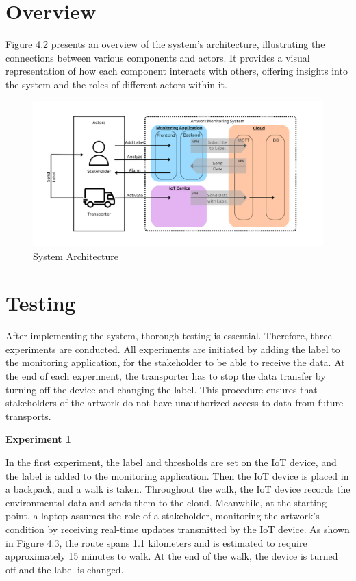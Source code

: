 \section{Overview}
Figure 4.2 presents an overview of the system's architecture, illustrating the connections between various components and actors. It provides a visual representation of how each component interacts with others, offering insights into the system and the roles of different actors within it.

\begin{figure}[H]
    \centering
    \includegraphics[width=1\linewidth]{System_Architecture.png}
    \caption{System Architecture}
    \label{fig:System Architecture}
\end{figure}

\section{Testing}
After implementing the system, thorough testing is essential. Therefore, three experiments are conducted. All experiments are initiated by adding the label to the monitoring application, for the stakeholder to be able to receive the data. At the end of each experiment, the transporter has to stop the data transfer by turning off the device and changing the label. This procedure ensures that stakeholders of the artwork do not have unauthorized access to data from future transports.

\textbf{Experiment 1}

In the first experiment, the label and thresholds are set on the IoT device, and the label is added to the monitoring application. Then the IoT device is placed in a backpack, and a walk is taken. Throughout the walk, the IoT device records the environmental data and sends them to the cloud. Meanwhile, at the starting point, a laptop assumes the role of a stakeholder, monitoring the artwork's condition by receiving real-time updates transmitted by the IoT device. As shown in Figure 4.3, the route spans 1.1 kilometers and is estimated to require approximately 15 minutes to walk. At the end of the walk, the device is turned off and the label is changed.

